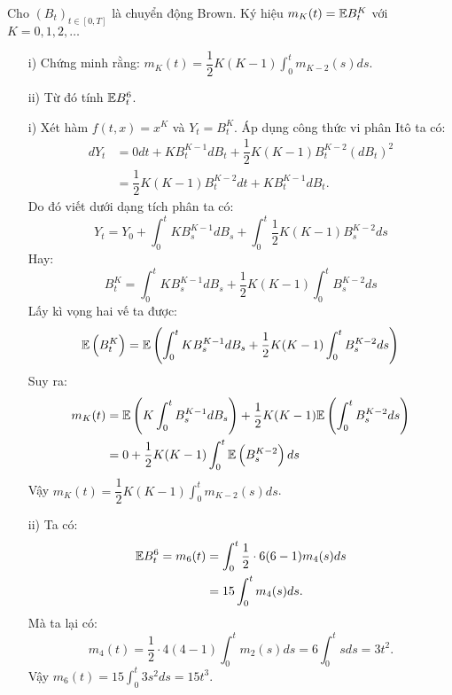\begin{exam*}
Cho $(B_t)_{t \in [0,T]}$ là chuyển động Brown. Ký hiệu $m_K(t) = \mathbb{E} B_t^K$ với $K = 0,1,2,\dots$
\begin{itemize}
    \item[i)] Chứng minh rằng: $m_K(t) = \dfrac{1}{2} K(K-1) \displaystyle \int_0^t m_{K-2}(s) ds$.
    \item[ii)] Từ đó tính $\mathbb{E} B_t^6$. 
\end{itemize}
\end{exam*}
\begin{sol*}
    \begin{itemize}
        \item[i)] Xét hàm $f(t,x)= x^K$ và $Y_t= B_t^K$. Áp dụng công thức vi phân Itô ta có:
        \begin{align*}
            dY_t 
            &= 0dt + K B_t^{K-1} dB_t + \dfrac{1}{2}K(K-1) B_t^{K-2} (dB_t)^2 \\
            &= \dfrac{1}{2}K(K-1) B_t^{K-2} dt + K B_t^{K-1} dB_t.
        \end{align*}
        Do đó viết dưới dạng tích phân ta có:
        \[Y_t = Y_0 + \displaystyle \int_0^t K B_s^{K-1} dB_s + \displaystyle \int_0^t \dfrac{1}{2}K(K-1) B_s^{K-2} ds\]
        Hay: \[ B_t^K = \displaystyle \int_0^t K B_s^{K-1} dB_s + \dfrac{1}{2}K(K-1) \displaystyle \int_0^t B_s^{K-2} ds\]
       Lấy kì vọng hai vế ta được:               
       \[\mathbb{E}\left(B_t^K\right)  = \mathbb{E}\left(\displaystyle \int_0^t K B_s^{K-1} dB_s + \dfrac{1}{2}K(K-1) \displaystyle \int_0^t B_s^{K-2} ds\right)  \]
       Suy ra: 
       \begin{align*}
           m_K(t) 
           &= \mathbb{E}\left(K\displaystyle \int_0^t B_s^{K-1} dB_s \right)+ \dfrac{1}{2}K(K-1)  \mathbb{E}\left(\displaystyle \int_0^t B_s^{K-2} ds\right)\\
           &= 0 + \dfrac{1}{2}K(K-1) \displaystyle \int_0^t \mathbb{E} \left(B_s^{K-2}\right) ds
       \end{align*}
       Vậy $m_K(t) = \dfrac{1}{2}K(K-1) \displaystyle \int_0^t m_{K-2} (s) ds$.
       \item[ii)] Ta có:
       \begin{align*}
           \mathbb{E} B_t^6 = m_6(t) 
           &= \displaystyle \int_0^t \dfrac{1}{2} \cdot 6(6-1) m_4(s) ds \\
           &= 15 \displaystyle \int_0^t m_4(s) ds.     
       \end{align*}
       Mà ta lại có: \[m_4(t) = \dfrac{1}{2} \cdot 4(4-1) \displaystyle \int_0^t m_2(s) ds = 6 \displaystyle \int_0^t s ds = 3t^2.\]
       Vậy $m_6(t) = 15 \displaystyle \int_0^t 3s^2 ds = 15t^3$.       
    \end{itemize}    
\end{sol*}
